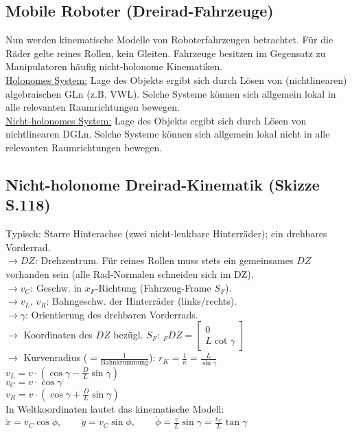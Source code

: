 \documentclass[a4paper,landscape,6pt]{article}
\newcommand{\mat}[1]{\ensuremath{\begin{bmatrix} #1 \end{bmatrix}}}				%
\newcommand{\ul}[1]{\underline{#1}}
\begin{document}
\begin{multicols}{3}
\section{Mobile Roboter \footnotesize{(Dreirad-Fahrzeuge)}}
Nun werden kinematische Modelle von Roboterfahrzeugen betrachtet. Für die Räder gelte reines Rollen, kein Gleiten. Fahrzeuge besitzen im Gegensatz zu Manipulatoren häufig nicht-holonome Kinematiken.\\
\ul{Holonomes System:} Lage des Objekts ergibt sich durch Lösen von (nichtlinearen) algebraischen GLn (z.B. VWL). Solche Systeme können sich allgemein lokal in alle relevanten Raumrichtungen bewegen.\\
\ul{Nicht-holonomes System:} Lage des Objekts ergibt sich durch Lösen von nichtlinearen DGLn. Solche Systeme können sich allgemein lokal nicht in alle relevanten Raumrichtungen bewegen.
\subsection*{Nicht-holonome Dreirad-Kinematik \footnotesize{(Skizze S.118)}}
Typisch: Starre Hinterachse (zwei nicht-lenkbare Hinterräder); ein drehbares Vorderrad.\\
$\rightarrow DZ$: Drehzentrum. Für reines Rollen muss stets ein gemeinsames $DZ$ vorhanden sein (alle Rad-Normalen schneiden sich im DZ).\\
$\rightarrow v_C$: Geschw. in $x_F$-Richtung (Fahrzeug-Frame $S_F$).\\
$\rightarrow v_L$, $v_R$: Bahngeschw. der Hinterräder (links/rechts).\\
$\rightarrow  \gamma$: Orientierung des drehbaren Vorderrads.\\
$\rightarrow$ Koordinaten des $DZ$ bezügl. $S_F$: ${}_F DZ = \mat{0 \\ L \cot \gamma}$\\
$\rightarrow$ Kurvenradius ($=\frac{1}{\text{Bahnkrümmung}}$): $r_K = \frac{1}{\kappa} = \frac{L}{\sin \gamma}$\\

$v_L = v \cdot (\cos \gamma - \frac{D}{L}\sin \gamma)$\\
$v_C = v \cdot \cos \gamma$\\
$v_R = v \cdot (\cos \gamma + \frac{D}{L}\sin \gamma)$\\

In Weltkoordinaten lautet das kinematische Modell:\\
$\boxed{\dot x = v_C \cos \phi, \qquad \dot y = v_C \sin \phi, \qquad  \dot \phi = \frac{v}{L}\sin\gamma = \frac{v_C}{L}\tan \gamma}$\\


\end{multicols}
\end{document}
